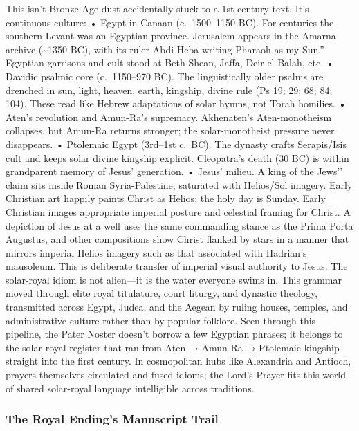 This isn't Bronze-Age dust accidentally stuck to a 1st-century text.
It’s continuous culture: • Egypt in Canaan (c.~1500--1150 BC).
For centuries the southern Levant was an Egyptian province.
Jerusalem appears in the Amarna archive (\textasciitilde1350 BC), with its ruler Abdi-Heba writing Pharaoh as my Sun.'' Egyptian garrisons and cult stood at Beth-Shean, Jaffa, Deir el-Balah, etc. • Davidic psalmic core (c.~1150--970 BC). The linguistically older psalms are drenched in sun, light, heaven, earth, kingship, divine rule (Ps 19; 29; 68; 84; 104). These read like Hebrew adaptations of solar hymns, not Torah homilies. • Aten's revolution and Amun-Ra's supremacy. Akhenaten's Aten-monotheism collapses, but Amun-Ra returns stronger; the solar-monotheist pressure never disappears. • Ptolemaic Egypt (3rd--1st c.~BC). The dynasty crafts Serapis/Isis cult and keeps solar divine kingship explicit. Cleopatra's death (30 BC) is within grandparent memory of Jesus' generation. • Jesus' milieu. A king of the Jews’’ claim sits inside Roman Syria-Palestine, saturated with Helios/Sol imagery.
Early Christian art happily paints Christ as Helios; the holy day is Sunday.
Early Christian images appropriate imperial posture and celestial framing for Christ.
A depiction of Jesus at a well uses the same commanding stance as the Prima Porta Augustus, and other compositions show Christ flanked by stars in a manner that mirrors imperial Helios imagery such as that associated with Hadrian's mausoleum.
This is deliberate transfer of imperial visual authority to Jesus.
The solar-royal idiom is not alien---it is the water everyone swims in.
This grammar moved through elite royal titulature, court liturgy, and dynastic theology, transmitted across Egypt, Judea, and the Aegean by ruling houses, temples, and administrative culture rather than by popular folklore.
Seen through this pipeline, the Pater Noster doesn't borrow a few Egyptian phrases; it belongs to the solar-royal register that ran from Aten → Amun-Ra → Ptolemaic kingship straight into the first century. In cosmopolitan hubs like Alexandria and Antioch, prayers themselves circulated and fused idioms; the Lord's Prayer fits this world of shared solar-royal language intelligible across traditions.

\subsubsection{The Royal Ending's Manuscript Trail}

